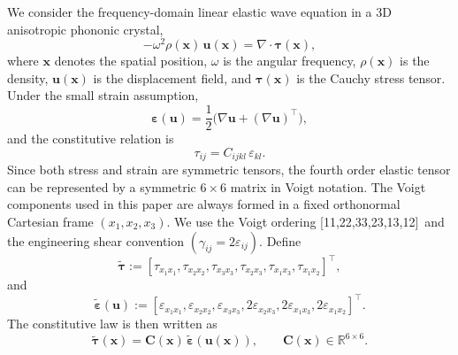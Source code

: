 \documentclass[11pt,oneside]{article}
\numberwithin{equation}{section}
\theoremstyle{plain}
\theoremstyle{remark}
\newcommand{\voigtorder}{[11,22,33,23,13,12]}
\newcommand{\engshear}{engineering shear convention \((\gamma_{ij}=2\varepsilon_{ij})\)}
\begin{document}
We consider the frequency-domain linear elastic wave equation in a 3D anisotropic phononic crystal,
\begin{equation}\label{eq:elastic_freq_main}
-\omega^2\rho(\mathbf x)\,\bm u(\mathbf x)=\nabla\cdot\bm\tau(\mathbf x),
\end{equation}
where \(\mathbf x\) denotes the spatial position, \(\omega\) is the angular frequency, \(\rho(\mathbf x)\) is the density, \(\bm u(\mathbf x)\) is the displacement field, and \(\bm\tau(\mathbf x)\) is the Cauchy stress tensor. Under the small strain assumption,
\begin{equation}\label{eq:strain_def_main}
\bm\varepsilon(\bm u)=\frac12\bigl(\nabla\bm u+(\nabla\bm u)^\top\bigr),
\end{equation}
and the constitutive relation is
\begin{equation}\label{eq:constitutive_4th_main}
\tau_{ij}=C_{ijkl}\,\varepsilon_{kl}.
\end{equation}
Since both stress and strain are symmetric tensors, the fourth order elastic tensor can be represented by a symmetric \(6\times6\) matrix in Voigt notation. The Voigt components used in this paper are always formed in a fixed orthonormal Cartesian frame \((x_1,x_2,x_3)\). We use the Voigt ordering \voigtorder\ and the \engshear. Define
\begin{equation}\label{eq:tau_voigt_main}
\widetilde{\bm\tau}:=
[\tau_{x_1x_1},\tau_{x_2x_2},\tau_{x_3x_3},
\tau_{x_2x_3},\tau_{x_1x_3},\tau_{x_1x_2}]^\top,
\end{equation}
and
\begin{equation}\label{eq:eps_voigt_main}
\widetilde{\bm\varepsilon}(\bm u):=
[\varepsilon_{x_1x_1},\varepsilon_{x_2x_2},\varepsilon_{x_3x_3},
2\varepsilon_{x_2x_3},2\varepsilon_{x_1x_3},2\varepsilon_{x_1x_2}]^\top.
\end{equation}
The constitutive law is then written as
\begin{equation}\label{eq:constitutive_voigt_main}
\widetilde{\bm\tau}(\mathbf x)=\bm C(\mathbf x)\,\widetilde{\bm\varepsilon}(\bm u(\mathbf x)),
\qquad
\bm C(\mathbf x)\in\mathbb R^{6\times6}.
\end{equation}
\end{document}
